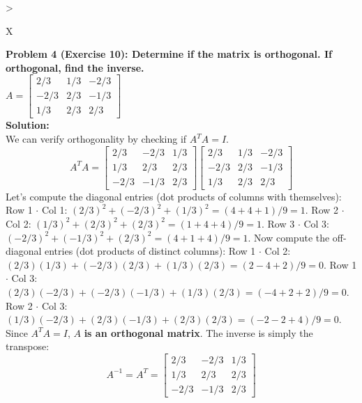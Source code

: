 \documentclass[11pt, letterpaper]{article}
\theoremstyle{definition}
\theoremstyle{remark}
\begin{document}
\begin{tabularx}{\textwidth}{>{\raggedright\arraybackslash}X}
\toprule
\textbf{Problem 4 (Exercise 10): Determine if the matrix is orthogonal. If orthogonal, find the inverse.} \\
$A = \begin{bmatrix} 2/3 & 1/3 & -2/3 \\ -2/3 & 2/3 & -1/3 \\ 1/3 & 2/3 & 2/3 \end{bmatrix}$ \\
\midrule
\textbf{Solution:} \\
We can verify orthogonality by checking if $A^T A = I$.
\[ A^T A = \begin{bmatrix} 2/3 & -2/3 & 1/3 \\ 1/3 & 2/3 & 2/3 \\ -2/3 & -1/3 & 2/3 \end{bmatrix} \begin{bmatrix} 2/3 & 1/3 & -2/3 \\ -2/3 & 2/3 & -1/3 \\ 1/3 & 2/3 & 2/3 \end{bmatrix} \]
Let's compute the diagonal entries (dot products of columns with themselves):
Row 1 $\cdot$ Col 1: $(2/3)^2 + (-2/3)^2 + (1/3)^2 = (4+4+1)/9 = 1$.
Row 2 $\cdot$ Col 2: $(1/3)^2 + (2/3)^2 + (2/3)^2 = (1+4+4)/9 = 1$.
Row 3 $\cdot$ Col 3: $(-2/3)^2 + (-1/3)^2 + (2/3)^2 = (4+1+4)/9 = 1$.
Now compute the off-diagonal entries (dot products of distinct columns):
Row 1 $\cdot$ Col 2: $(2/3)(1/3) + (-2/3)(2/3) + (1/3)(2/3) = (2 - 4 + 2)/9 = 0$.
Row 1 $\cdot$ Col 3: $(2/3)(-2/3) + (-2/3)(-1/3) + (1/3)(2/3) = (-4 + 2 + 2)/9 = 0$.
Row 2 $\cdot$ Col 3: $(1/3)(-2/3) + (2/3)(-1/3) + (2/3)(2/3) = (-2 - 2 + 4)/9 = 0$.
Since $A^T A = I$, $A$ \textbf{is an orthogonal matrix}.
The inverse is simply the transpose:
\[ A^{-1} = A^T = \begin{bmatrix} 2/3 & -2/3 & 1/3 \\ 1/3 & 2/3 & 2/3 \\ -2/3 & -1/3 & 2/3 \end{bmatrix} \] \\
\bottomrule
\end{tabularx}
\vspace{1em}
\end{document}

